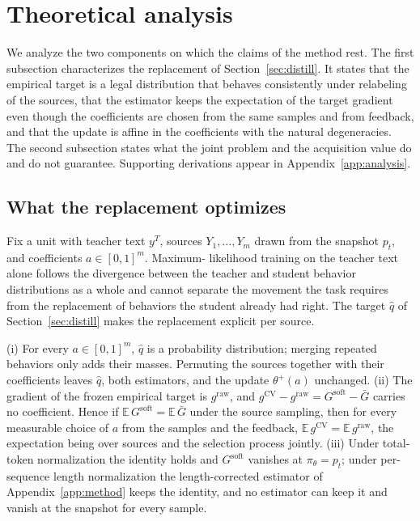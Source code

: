 \section{Theoretical analysis}\label{sec:theory}

We analyze the two components on which the claims of the method rest.
The first subsection characterizes the replacement of
Section~\ref{sec:distill}. It states that the empirical target is a
legal distribution that behaves consistently under relabeling of the
sources, that the estimator keeps the expectation of the target
gradient even though the coefficients are chosen from the same samples
and from feedback, and that the update is affine in the coefficients
with the natural degeneracies. The second subsection states what the
joint problem and the acquisition value do and do not guarantee.
Supporting derivations appear in Appendix~\ref{app:analysis}.

\subsection{What the replacement optimizes}\label{sec:theory-mech}
Fix a unit with teacher text $y^T$, sources $Y_1,\ldots,Y_m$ drawn
from the snapshot $p_t$, and coefficients $a\in[0,1]^m$. Maximum-
likelihood training on the teacher text alone follows the divergence
between the teacher and student behavior distributions as a whole and
cannot separate the movement the task requires from the replacement
of behaviors the student already had right. The target $\hat q$ of
Section~\ref{sec:distill} makes the replacement explicit per source.

\begin{proposition}
\label{prop:target}
(i) For every $a\in[0,1]^m$, $\hat q$ is a probability distribution;
merging repeated behaviors only adds their masses. Permuting the
sources together with their coefficients leaves $\hat q$, both
estimators, and the update $\theta^{+}(a)$ unchanged. (ii) The
gradient of the frozen empirical target is $g^{\mathrm{raw}}$, and
$g^{\mathrm{CV}}-g^{\mathrm{raw}}=G^{\mathrm{soft}}-\bar G$ carries no
coefficient. Hence if $\mathbb{E}\,G^{\mathrm{soft}}=\mathbb{E}\,\bar G$
under the source sampling, then for every measurable choice of $a$
from the samples and the feedback,
$\mathbb{E}\,g^{\mathrm{CV}}=\mathbb{E}\,g^{\mathrm{raw}}$, the
expectation being over sources and the selection process jointly.
(iii) Under total-token normalization the identity holds and
$G^{\mathrm{soft}}$ vanishes at $\pi_\theta=p_t$; under per-sequence
length normalization the length-corrected estimator of
Appendix~\ref{app:method} keeps the identity, and no estimator can keep
it and vanish at the snapshot for every sample.
\end{proposition}

